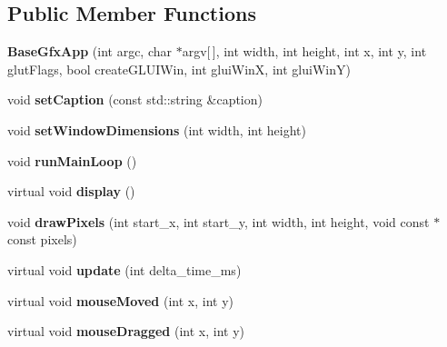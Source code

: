 \subsection*{Public Member Functions}
\begin{DoxyCompactItemize}
\item 
\hypertarget{classBaseGfxApp_a534a4b5293a35947fdae3805a103541d}{{\bfseries Base\-Gfx\-App} (int argc, char $\ast$argv\mbox{[}$\,$\mbox{]}, int width, int height, int x, int y, int glut\-Flags, bool create\-G\-L\-U\-I\-Win, int glui\-Win\-X, int glui\-Win\-Y)}\label{classBaseGfxApp_a534a4b5293a35947fdae3805a103541d}

\item 
\hypertarget{classBaseGfxApp_a4b3b1a475b7f2babaf1b477c34b15fb1}{void {\bfseries set\-Caption} (const std\-::string \&caption)}\label{classBaseGfxApp_a4b3b1a475b7f2babaf1b477c34b15fb1}

\item 
\hypertarget{classBaseGfxApp_a32fb420886f442d6be6b391a2ed3ecc1}{void {\bfseries set\-Window\-Dimensions} (int width, int height)}\label{classBaseGfxApp_a32fb420886f442d6be6b391a2ed3ecc1}

\item 
\hypertarget{classBaseGfxApp_acda031916c00d56c2dc901e2653e3083}{void {\bfseries run\-Main\-Loop} ()}\label{classBaseGfxApp_acda031916c00d56c2dc901e2653e3083}

\item 
\hypertarget{classBaseGfxApp_ac8de2d5a955582547af5619b771b4d6d}{virtual void {\bfseries display} ()}\label{classBaseGfxApp_ac8de2d5a955582547af5619b771b4d6d}

\item 
\hypertarget{classBaseGfxApp_a4b8d896c2fff8482553207552bc54f0a}{void {\bfseries draw\-Pixels} (int start\-\_\-x, int start\-\_\-y, int width, int height, void const $\ast$const pixels)}\label{classBaseGfxApp_a4b8d896c2fff8482553207552bc54f0a}

\item 
\hypertarget{classBaseGfxApp_a67737f7cc360b008394b1e882ed5b5d6}{virtual void {\bfseries update} (int delta\-\_\-time\-\_\-ms)}\label{classBaseGfxApp_a67737f7cc360b008394b1e882ed5b5d6}

\item 
\hypertarget{classBaseGfxApp_a0956b82d7fa58b623c498aea7073dbba}{virtual void {\bfseries mouse\-Moved} (int x, int y)}\label{classBaseGfxApp_a0956b82d7fa58b623c498aea7073dbba}

\item 
\hypertarget{classBaseGfxApp_abb23f716dd6612b3a72938e41525d338}{virtual void {\bfseries mouse\-Dragged} (int x, int y)}\label{classBaseGfxApp_abb23f716dd6612b3a72938e41525d338}


\end{DoxyCompactItemize}
